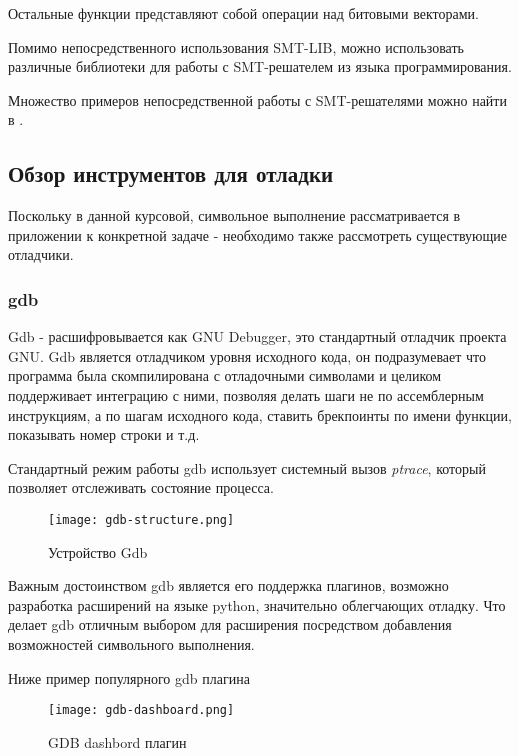 Остальные функции представляют собой операции над битовыми векторами.

\bigskip

Помимо непосредственного использования SMT-LIB, можно использовать различные библиотеки для работы с SMT-решателем из языка программирования.

Множество примеров непосредственной работы с SMT-решателями можно найти в \cite{yusmt}.


\subsection{Обзор инструментов для отладки}

Поскольку в данной курсовой, символьное выполнение рассматривается в приложении к конкретной задаче - необходимо также рассмотреть существующие отладчики.

\subsubsection{gdb}

Gdb \cite{gdb} - расшифровывается как GNU Debugger, это стандартный отладчик проекта GNU.
Gdb является отладчиком уровня исходного кода, он подразумевает что программа была скомпилирована с отладочными символами и целиком поддерживает интеграцию с ними, позволяя делать шаги не по ассемблерным инструкциям, а по шагам исходного кода, ставить брекпоинты по имени функции, показывать номер строки и т.д.

Стандартный режим работы gdb использует системный вызов {\em ptrace}, который позволяет отслеживать состояние процесса.

\begin{figure}[h]
\centering
\texttt{[image: gdb-structure.png]}
\caption{Устройство Gdb}
\label{fig:gdb1}
\end{figure}

Важным достоинством gdb является его поддержка плагинов, возможно разработка расширений на языке python, значительно облегчающих отладку. Что делает gdb отличным выбором для расширения посредством добавления возможностей символьного выполнения.

Ниже пример популярного gdb плагина

\begin{figure}[h]
\centering
\texttt{[image: gdb-dashboard.png]}
\caption{GDB dashbord плагин}
\label{fig:gdb2}
\end{figure}

